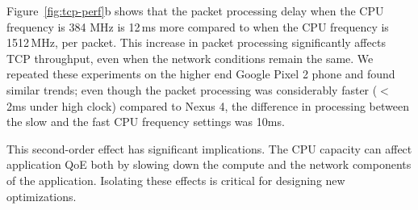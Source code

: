 Figure~\ref{fig:tcp-perf}b shows that the packet processing delay when the CPU frequency is 384 MHz is 
12\,ms more compared to when the CPU frequency is 1512\,MHz, per packet. This increase in packet processing significantly affects TCP throughput, even when the network conditions remain the same. We repeated these experiments on the higher end Google Pixel 2 phone and found similar trends; even though the packet processing was considerably faster ($<$ 2ms under high clock) compared to Nexus 4, the difference in processing between the slow and the fast CPU frequency settings was 10ms.  

This second-order effect has significant implications.  The CPU capacity can affect application QoE both by slowing down the compute and the network components of the application. Isolating these effects is critical for designing new optimizations.










